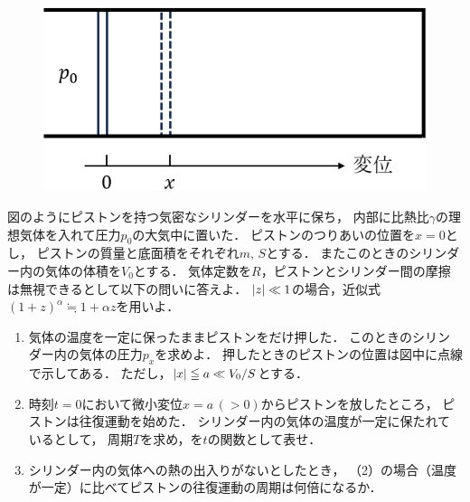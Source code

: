 \setcounter{figure}{0}
{
\begin{figure}
  \vspace{-\intextsep}
  \includegraphics[width=16zw]{../graphs/se_1H_120.png}
\end{figure}
図のようにピストンを持つ気密なシリンダーを水平に保ち，
内部に比熱比$\gamma$の理想気体を入れて圧力$p_0$の大気中に置いた．
ピストンのつりあいの位置を$x=0$とし，
ピストンの質量と底面積をそれぞれ$m,\,S$とする．
またこのときのシリンダー内の気体の体積を$V_0$とする．
気体定数を$R$，ピストンとシリンダー間の摩擦は無視できるとして以下の問いに答えよ．
$\lvert z\rvert\ll 1$の場合，近似式$(1+z)^\alpha \fallingdotseq 1+\alpha z$を用いよ．

\par}
\begin{enumerate}[（1）]
  \setlength{\leftskip}{-1.5zw}
  \setlength{\itemindent}{1zw}\setlength{\labelsep}{0.5zw}
  \setlength{\labelwidth}{1zw}\setlength{\leftmargin}{1zw}
  \setlength{\itemsep}{0.5\baselineskip}
  \item 気体の温度を一定に保ったままピストンを\x だけ押した．
  このときのシリンダー内の気体の圧力$p_x$を求めよ．
  押したときのピストンの位置は図中に点線で示してある．
  ただし，$\lvert x\rvert\leqq a\ll V_0/S$とする．
  \item 時刻$t=0$において微小変位$x=a\,(>0)$からピストンを放したところ，
  ピストンは往復運動を始めた．
  シリンダー内の気体の温度が一定に保たれているとして，
  周期$T$を求め，\x を$t$の関数として表せ．
  \item シリンダー内の気体への熱の出入りがないとしたとき，
  （2）の場合（温度が一定）に比べてピストンの往復運動の周期は何倍になるか．
\end{enumerate}

